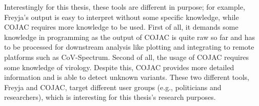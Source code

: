     Interestingly for this thesis, these tools are different in purpose; for example, Freyja’s output is easy to interpret without some specific knowledge, while COJAC requires more knowledge to be used. First of all, it demands some knowledge in programming as the output of COJAC is quite raw so far and has to be processed for downstream analysis like plotting and integrating to remote platforms such as CoV-Spectrum. Second of all, the usage of COJAC requires some knowledge of virology. Despite this, COJAC provides more detailed information and is able to detect unknown variants. These two different tools, Freyja and COJAC, target different user groups (e.g., politicians and researchers), which is interesting for this thesis's research purposes.
    